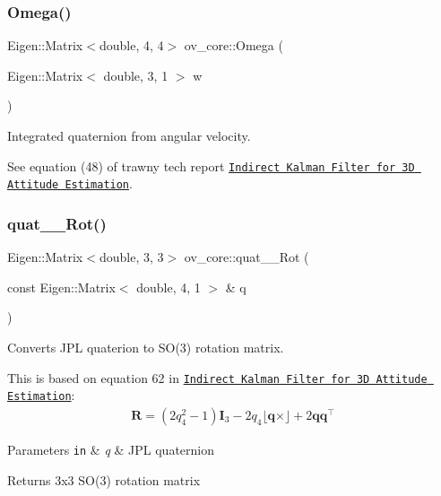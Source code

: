 \subsubsection{\texorpdfstring{Omega()}{Omega()}}
{\footnotesize\ttfamily Eigen\+::\+Matrix$<$double, 4, 4$>$ ov\+\_\+core\+::\+Omega (\begin{DoxyParamCaption}\item[{Eigen\+::\+Matrix$<$ double, 3, 1 $>$}]{w }\end{DoxyParamCaption})\hspace{0.3cm}{\ttfamily [inline]}}



Integrated quaternion from angular velocity. 

See equation (48) of trawny tech report \href{http://mars.cs.umn.edu/tr/reports/Trawny05b.pdf}{\tt Indirect Kalman Filter for 3D Attitude Estimation}. \mbox{\label{namespaceov__core_adfb06397034cc6b346efb9517ed3757e}} 
\subsubsection{\texorpdfstring{quat\+\_\+\_\+\+Rot()}{quat\_2\_Rot()}}
{\footnotesize\ttfamily Eigen\+::\+Matrix$<$double, 3, 3$>$ ov\+\_\+core\+::quat\+\_\+\_\+\+Rot (\begin{DoxyParamCaption}\item[{const Eigen\+::\+Matrix$<$ double, 4, 1 $>$ \&}]{q }\end{DoxyParamCaption})\hspace{0.3cm}{\ttfamily [inline]}}



Converts J\+PL quaterion to S\+O(3) rotation matrix. 

This is based on equation 62 in \href{http://mars.cs.umn.edu/tr/reports/Trawny05b.pdf}{\tt Indirect Kalman Filter for 3D Attitude Estimation}\+: \begin{align*} \mathbf{R} = (2q_4^2-1)\mathbf{I}_3-2q_4\lfloor\mathbf{q}\times\rfloor+2\mathbf{q}\mathbf{q}^\top \end{align*}


\begin{DoxyParams}[1]{Parameters}
\mbox{\tt in}  & {\em q} & J\+PL quaternion \\
\hline
\end{DoxyParams}
\begin{DoxyReturn}{Returns}
3x3 S\+O(3) rotation matrix 
\end{DoxyReturn}
\mbox{\label{namespaceov__core_aa708e95617ccac1c880451014f2715fa}} 
